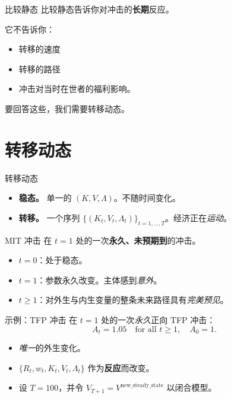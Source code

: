 \documentclass[10pt,aspectratio=169]{beamer}
\begin{document}
\begin{frame}{比较静态}
  比较静态告诉你对冲击的\textbf{长期}反应。

  它不告诉你：
  \begin{itemize}
    \item 转移的速度
    \item 转移的路径
    \item 冲击对当时在世者的福利影响。
  \end{itemize}

  要回答这些，我们需要转移动态。
\end{frame}

\section[转移动态]{转移动态}

\begin{frame}{转移动态}
  \begin{itemize}
    \item \textbf{稳态。} 单一的 $(K, V, \Lambda)$。不随时间变化。
    \item \textbf{转移。} 一个序列 $\{(K_t, V_t, \Lambda_t)\}_{t = 1,\dots,T}$。经济正在\emph{运动}。
  \end{itemize}
\end{frame}

\begin{frame}{MIT 冲击}
  在 $t = 1$ 处的一次\textbf{永久、未预期到}的冲击。
  \begin{itemize}
    \item $t = 0$：处于稳态。
    \item $t = 1$：参数永久改变。主体感到\emph{意外}。
    \item $t \geq 1$：对外生与内生变量的整条未来路径具有\emph{完美预见}。
  \end{itemize}
\end{frame}

\begin{frame}{示例：TFP 冲击}
  在 $t = 1$ 处的一次\emph{永久}正向 TFP 冲击：
  \[
    A_t = 1.05 \quad \text{for all } t \geq 1, \quad A_0 = 1.
  \]
  \begin{itemize}
    \item \emph{唯一}的外生变化。
    \item $\{R_t, w_t, K_t, V_t, \Lambda_t\}$ 作为\textbf{反应}而改变。
    \item 设 $T = 100$，并令 $V_{T+1} = V^\text{new\_steady\_state}$ 以闭合模型。
  \end{itemize}
\end{frame}
\end{document}

